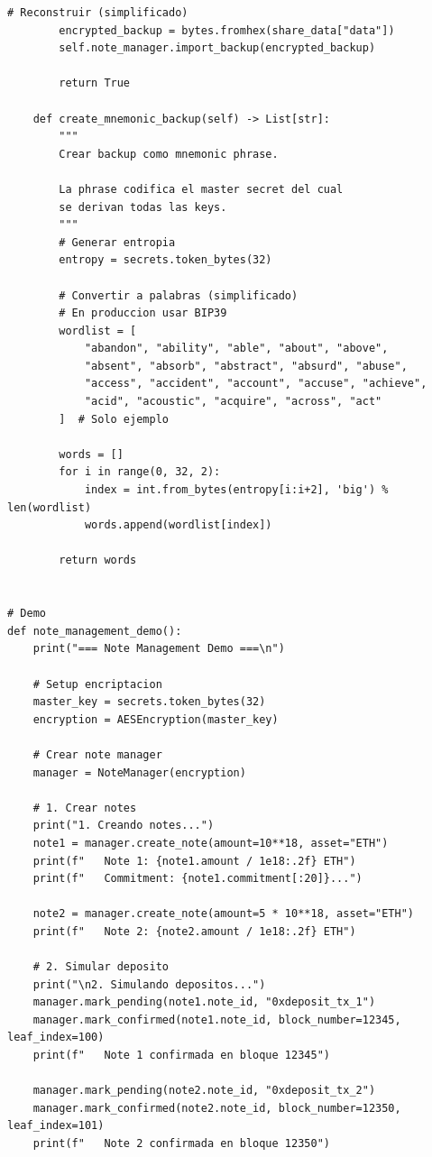 \documentclass[11pt,a4paper,twoside]{book}
\theoremstyle{definition}
\theoremstyle{remark}
\begin{document}
\begin{lstlisting}[style=python, caption={Sistema completo de gestión de notes}]
        # Reconstruir (simplificado)
        encrypted_backup = bytes.fromhex(share_data["data"])
        self.note_manager.import_backup(encrypted_backup)
        
        return True
    
    def create_mnemonic_backup(self) -> List[str]:
        """
        Crear backup como mnemonic phrase.
        
        La phrase codifica el master secret del cual
        se derivan todas las keys.
        """
        # Generar entropia
        entropy = secrets.token_bytes(32)
        
        # Convertir a palabras (simplificado)
        # En produccion usar BIP39
        wordlist = [
            "abandon", "ability", "able", "about", "above",
            "absent", "absorb", "abstract", "absurd", "abuse",
            "access", "accident", "account", "accuse", "achieve",
            "acid", "acoustic", "acquire", "across", "act"
        ]  # Solo ejemplo
        
        words = []
        for i in range(0, 32, 2):
            index = int.from_bytes(entropy[i:i+2], 'big') % len(wordlist)
            words.append(wordlist[index])
        
        return words


# Demo
def note_management_demo():
    print("=== Note Management Demo ===\n")
    
    # Setup encriptacion
    master_key = secrets.token_bytes(32)
    encryption = AESEncryption(master_key)
    
    # Crear note manager
    manager = NoteManager(encryption)
    
    # 1. Crear notes
    print("1. Creando notes...")
    note1 = manager.create_note(amount=10**18, asset="ETH")
    print(f"   Note 1: {note1.amount / 1e18:.2f} ETH")
    print(f"   Commitment: {note1.commitment[:20]}...")
    
    note2 = manager.create_note(amount=5 * 10**18, asset="ETH")
    print(f"   Note 2: {note2.amount / 1e18:.2f} ETH")
    
    # 2. Simular deposito
    print("\n2. Simulando depositos...")
    manager.mark_pending(note1.note_id, "0xdeposit_tx_1")
    manager.mark_confirmed(note1.note_id, block_number=12345, leaf_index=100)
    print(f"   Note 1 confirmada en bloque 12345")
    
    manager.mark_pending(note2.note_id, "0xdeposit_tx_2")
    manager.mark_confirmed(note2.note_id, block_number=12350, leaf_index=101)
    print(f"   Note 2 confirmada en bloque 12350")
    

\end{lstlisting}
\end{document}
